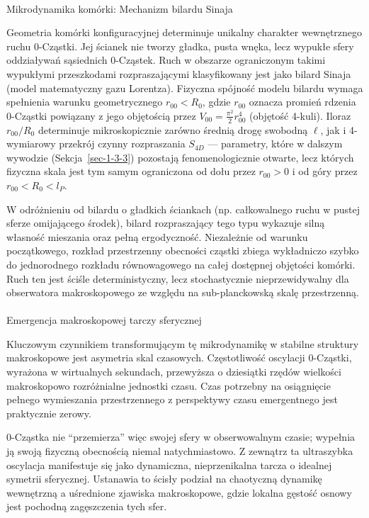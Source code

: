 \documentclass[
  polish,
  letterpaper,
  DIV=11,
  numbers=noendperiod,
  oneside]{scrartcl}
\makeatletter
\let\oldparagraph\paragraph
\renewcommand{\paragraph}{
    \@ifstar
      \xxxParagraphStar
      \xxxParagraphNoStar
  }
\newcommand{\xxxParagraphStar}[1]{\oldparagraph*{#1}\mbox{}}
\newcommand{\xxxParagraphNoStar}[1]{\oldparagraph{#1}\mbox{}}
\makeatother
\begin{document}
\paragraph{Mikrodynamika komórki: Mechanizm bilardu
Sinaja}\label{sec-1-2-1-1}

Geometria komórki konfiguracyjnej determinuje unikalny charakter
wewnętrznego ruchu 0-Cząstki. Jej ścianek nie tworzy gładka, pusta
wnęka, lecz wypukłe sfery oddziaływań sąsiednich 0-Cząstek. Ruch w
obszarze ograniczonym takimi wypukłymi przeszkodami rozpraszającymi
klasyfikowany jest jako bilard Sinaja (model matematyczny gazu
Lorentza). Fizyczna spójność modelu bilardu wymaga spełnienia warunku
geometrycznego \(r_{00}<R_0\), gdzie \(r_{00}\) oznacza promień rdzenia
0-Cząstki powiązany z jego objętością przez
\(V_{00}=\frac{\pi^2}{2}r_{00}^4\) (objętość 4-kuli). Iloraz
\(r_{00}/R_0\) determinuje mikroskopicznie zarówno średnią drogę
swobodną \(\ell\), jak i 4-wymiarowy przekrój czynny rozpraszania
\(S_{4D}\) --- parametry, które w dalszym wywodzie
(Sekcja~\ref{sec-1-3-3}) pozostają fenomenologicznie otwarte, lecz
których fizyczna skala jest tym samym ograniczona od dołu przez
\(r_{00}>0\) i od góry przez \(r_{00}<R_0<l_P\).

W odróżnieniu od bilardu o gładkich ściankach (np. całkowalnego ruchu w
pustej sferze omijającego środek), bilard rozpraszający tego typu
wykazuje silną własność mieszania oraz pełną ergodyczność. Niezależnie
od warunku początkowego, rozkład przestrzenny obecności cząstki zbiega
wykładniczo szybko do jednorodnego rozkładu równowagowego na całej
dostępnej objętości komórki. Ruch ten jest ściśle deterministyczny, lecz
stochastycznie nieprzewidywalny dla obserwatora makroskopowego ze
względu na sub-planckowską skalę przestrzenną.

\paragraph{Emergencja makroskopowej tarczy
sferycznej}\label{sec-1-2-1-2}

Kluczowym czynnikiem transformującym tę mikrodynamikę w stabilne
struktury makroskopowe jest asymetria skal czasowych. Częstotliwość
oscylacji 0-Cząstki, wyrażona w wirtualnych sekundach, przewyższa o
dziesiątki rzędów wielkości makroskopowo rozróżnialne jednostki czasu.
Czas potrzebny na osiągnięcie pełnego wymieszania przestrzennego z
perspektywy czasu emergentnego jest praktycznie zerowy.

0-Cząstka nie ``przemierza'' więc swojej sfery w obserwowalnym czasie;
wypełnia ją swoją fizyczną obecnością niemal natychmiastowo. Z zewnątrz
ta ultraszybka oscylacja manifestuje się jako dynamiczna, nieprzenikalna
tarcza o idealnej symetrii sferycznej. Ustanawia to ścisły podział na
chaotyczną dynamikę wewnętrzną a uśrednione zjawiska makroskopowe, gdzie
lokalna gęstość osnowy jest pochodną zagęszczenia tych sfer.
\end{document}
